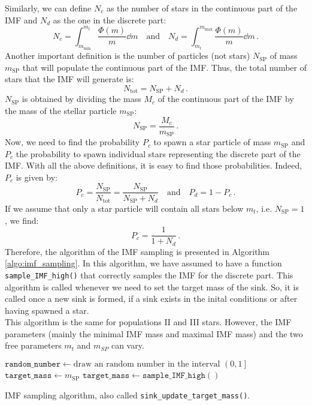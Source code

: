 \documentclass[a4paper]{ar-1col-S2O}
\begin{document}
Similarly, we can define $N_c$ as the number of stars in the continuous part of the IMF and $N_d$ as the one in the discrete part:
%
\begin{equation}
    N_c =  \int_{m_\text{min}}^{m_t} \frac{\Phi(m)}{m} \dd m \quad \text{and} \quad  N_d =  \int_{m_t}^{m_\text{max}} \frac{\Phi(m)}{m} \dd m \, .
\end{equation}
%
Another important definition is the number of particles (not stars) $N_{\text{SP}}$ of mass $m_{\text{SP}}$ that will populate the continuous part of the IMF. Thus, the total number of stars that the IMF will generate is:
%
\begin{equation}
    N_{\text{tot}} = N_{\text{SP}} + N_d \, .
\end{equation}
%
$N_{\text{SP}}$ is obtained by dividing the mass $M_c$ of the continuous part of the IMF by the mass of the stellar particle $m_{\text{SP}}$:
%
\begin{equation}
    N_{\text{SP}} = \frac{M_c}{m_{\text{SP}}} \, .
\end{equation}
%
Now, we need to find the probability $P_c$ to spawn a star particle of mass $m_\text{SP}$ and $P_c$ the probability to spawn individual stars representing the discrete part of the IMF. With all the above definitions, it is easy to find those probabilities. Indeed, $P_c$ is given by:
%
\begin{equation}
    P_c = \frac{N_{\text{SP}}}{N_{\text{tot}}} = \frac{N_{\text{SP}}}{N_{\text{SP}} + N_d} \quad \text{and} \quad P_d = 1 - P_c \, .
\end{equation}
%
If we assume that only a star particle will contain all stars below $m_t$, i.e. $N_{\text{SP}} = 1$, we find:
%
\begin{equation}
    P_c = \frac{1}{1 + N_d} \, . 
\end{equation}
%
Therefore, the algorithm of the IMF sampling is presented in Algorithm \ref{algo:imf_sampling}. In this algorithm, we have assumed to have a function \texttt{sample\_IMF\_high()} that correctly samples the IMF for the discrete part. This algorithm is called whenever we need to set the target mass of the sink. So, it is called once a new sink is formed, if a sink exists in the inital conditions or after having spawned a star. \\

This algorithm is the same for populations II and III stars. However, the IMF parameters (mainly the minimal IMF mass and maximal IMF mass) and the two free parameters $m_t$ and $m_{SP}$ can vary.

\begin{algorithm}
  \begin{algorithmic}
      \State $\mathtt{random\_number} \gets \text{draw an random number in the interval }\left(0, 1 \right]$ 
        \State $\mathtt{target\_mass} \gets m_{\text{SP}}$
      \Else
        \State $\mathtt{target\_mass} \gets \mathtt{sample\_IMF\_high()}$
      \EndIf
\end{algorithmic}
\caption{IMF sampling algorithm, also called \texttt{sink\_update\_target\_mass()}. }\label{algo:imf_sampling}
\end{algorithm}
\end{document}
